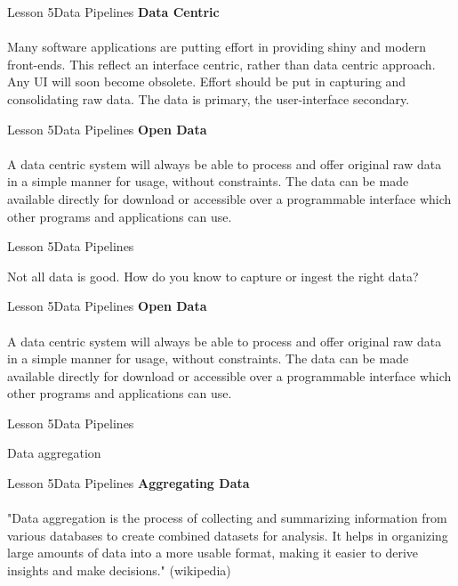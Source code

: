 \documentclass[aspectratio=1610]{beamer}
\begin{document}
\begin{frame}{Lesson 5}{Data Pipelines}
\LARGE
\textbf{Data Centric}\\~\\
Many software applications are putting effort in providing shiny and 
modern front-ends. This reflect an interface centric, rather than 
data centric approach. Any UI will soon become obsolete. Effort 
should be put in capturing and consolidating raw data. The data is 
primary, the user-interface secondary.
\end{frame}



\begin{frame}{Lesson 5}{Data Pipelines}
\LARGE
\textbf{Open Data}\\~\\
A data centric system will always be able to process and offer 
original raw data in a simple manner for usage, without constraints. 
The data can be made available directly for download or accessible 
over a programmable interface which other programs and applications 
can use.
\end{frame}




\begin{frame}{Lesson 5}{Data Pipelines}
\Huge
\begin{center}
Not all data is good. How do you know to capture or ingest the right 
data? 
\end{center}
\end{frame}


\begin{frame}{Lesson 5}{Data Pipelines}
\LARGE
\textbf{Open Data}\\~\\
A data centric system will always be able to process and offer 
original raw data in a simple manner for usage, without constraints. 
The data can be made available directly for download or accessible 
over a programmable interface which other programs and applications 
can use.
\end{frame}


\begin{frame}{Lesson 5}{Data Pipelines}
\Huge
\begin{center}
Data aggregation
\end{center}
\end{frame}



\begin{frame}{Lesson 5}{Data Pipelines}
\LARGE
\textbf{Aggregating Data}\\~\\
"Data aggregation is the process of collecting and summarizing 
information from various databases to create combined datasets for 
analysis. It helps in organizing large amounts of data into a more 
usable format, making it easier to derive insights and make 
decisions." (wikipedia)
\end{frame}
\end{document}
